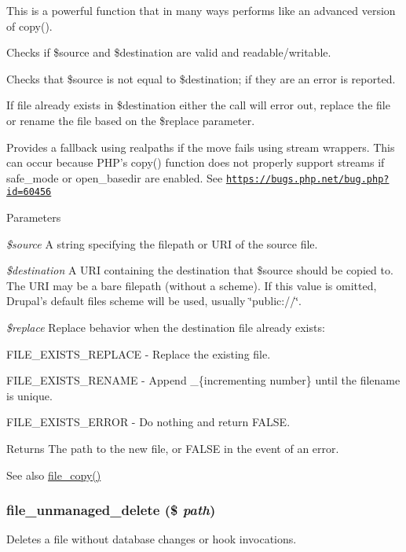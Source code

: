 This is a powerful function that in many ways performs like an advanced version of copy().
\begin{DoxyItemize}
\item Checks if \$source and \$destination are valid and readable/writable.
\item Checks that \$source is not equal to \$destination; if they are an error is reported.
\item If file already exists in \$destination either the call will error out, replace the file or rename the file based on the \$replace parameter.
\item Provides a fallback using realpaths if the move fails using stream wrappers. This can occur because PHP's copy() function does not properly support streams if safe\_\-mode or open\_\-basedir are enabled. See \href{https://bugs.php.net/bug.php?id=60456}{\tt https://bugs.php.net/bug.php?id=60456}
\end{DoxyItemize}


\begin{DoxyParams}{Parameters}
\item[{\em \$source}]A string specifying the filepath or URI of the source file. \item[{\em \$destination}]A URI containing the destination that \$source should be copied to. The URI may be a bare filepath (without a scheme). If this value is omitted, Drupal's default files scheme will be used, usually \char`\"{}public://\char`\"{}. \item[{\em \$replace}]Replace behavior when the destination file already exists:
\begin{DoxyItemize}
\item FILE\_\-EXISTS\_\-REPLACE -\/ Replace the existing file.
\item FILE\_\-EXISTS\_\-RENAME -\/ Append \_\-\{incrementing number\} until the filename is unique.
\item FILE\_\-EXISTS\_\-ERROR -\/ Do nothing and return FALSE.
\end{DoxyItemize}\end{DoxyParams}
\begin{DoxyReturn}{Returns}
The path to the new file, or FALSE in the event of an error.
\end{DoxyReturn}
\begin{DoxySeeAlso}{See also}
\hyperlink{group__file_gae49a2da7203ef43ae7adcf128d58d860}{file\_\-copy()} 
\end{DoxySeeAlso}
\hypertarget{group__file_ga336a7e83da1397131e665d1c6e97fc83}{
\subsubsection[{file\_\-unmanaged\_\-delete}]{\setlength{\rightskip}{0pt plus 5cm}file\_\-unmanaged\_\-delete (\$ {\em path})}}
\label{group__file_ga336a7e83da1397131e665d1c6e97fc83}
Deletes a file without database changes or hook invocations.

